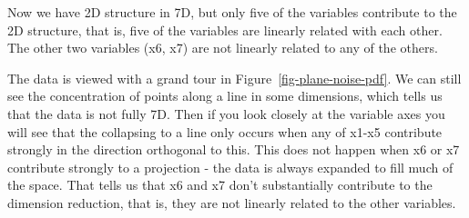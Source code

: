 \documentclass[
  letterpaper,
]{krantz}
\begin{document}
Now we have 2D structure in 7D, but only five of the variables
contribute to the 2D structure, that is, five of the variables are
linearly related with each other. The other two variables (x6, x7) are
not linearly related to any of the others.

The data is viewed with a grand tour in
Figure~\ref{fig-plane-noise-pdf}. We can still see the concentration of
points along a line in some dimensions, which tells us that the data is
not fully 7D. Then if you look closely at the variable axes you will see
that the collapsing to a line only occurs when any of x1-x5 contribute
strongly in the direction orthogonal to this. This does not happen when
x6 or x7 contribute strongly to a projection - the data is always
expanded to fill much of the space. That tells us that x6 and x7 don't
substantially contribute to the dimension reduction, that is, they are
not linearly related to the other variables.
\end{document}

